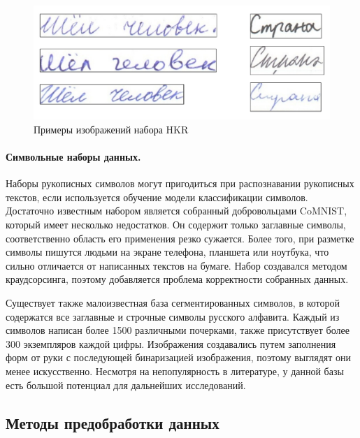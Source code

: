 \begin{figure}[h!]
    \centering
    \includegraphics[width=\textwidth]{img/hkr}
    \caption{Примеры изображений набора HKR}
    \label{fig:hkr-examples}
\end{figure}

\paragraph{Символьные наборы данных.}{Наборы рукописных символов могут пригодиться при распознавании рукописных текстов, если используется обучение модели классификации символов.
Достаточно известным набором является собранный добровольцами CoMNIST, который имеет несколько недостатков.
Он содержит только заглавные символы, соответственно область его применения резко сужается.
Более того, при разметке символы пишутся людьми на экране телефона, планшета или ноутбука, что сильно отличается от написанных текстов на бумаге.
Набор создавался методом краудсорсинга, поэтому добавляется проблема корректности собранных данных.

Существует также малоизвестная база сегментированных символов, в которой содержатся все заглавные и строчные символы русского алфавита.
Каждый из символов написан более 1500 различными почерками, также присутствует более 300 экземпляров каждой цифры.
Изображения создавались путем заполнения форм от руки с последующей бинаризацией изображения, поэтому выглядят они менее искусственно.
Несмотря на непопулярность в литературе, у данной базы есть большой потенциал для дальнейших исследований.}


\subsection{Методы предобработки данных}
\label{subsec:preprocessing}

